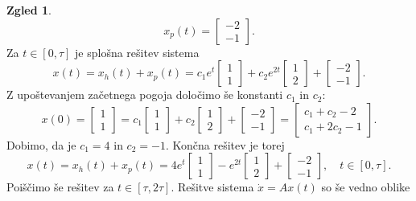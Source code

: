 \documentclass[12pt,a4paper]{amsart}
\theoremstyle{definition} %
\newtheorem{zgled}[definicija]{Zgled}
\theoremstyle{plain} %
\begin{document}
\begin{zgled}
    \[x_p(t)=
    \begin{bmatrix}
        -2  \\
        -1  
    \end{bmatrix}.\]
    Za $t\in[0,\tau]$ je splošna rešitev sistema
    \[x(t)=x_h(t)+x_p(t)= c_1e^t\begin{bmatrix}
        1 \\
        1 
    \end{bmatrix}
    +c_2e^{2t}\begin{bmatrix}
        1 \\
        2 
    \end{bmatrix} + \begin{bmatrix}
        -2  \\
        -1  
    \end{bmatrix}.\]
    Z upoštevanjem začetnega pogoja določimo še konstanti $c_1$ in $c_2$:
    \[x(0)=\begin{bmatrix}
        1  \\
        1  
    \end{bmatrix} = c_1 \begin{bmatrix}
        1  \\
        1  
    \end{bmatrix} + c_2 \begin{bmatrix}
        1  \\
        2  
    \end{bmatrix} + \begin{bmatrix}
        -2  \\
        -1  
    \end{bmatrix} = \begin{bmatrix}
        c_1 + c_2 -2  \\
        c_1+2c_2 -1  
    \end{bmatrix}.\]
    Dobimo, da je $c_1=4$ in $c_2=-1$. Končna rešitev je torej 
    \[x(t)=x_h(t)+x_p(t)= 4e^t\begin{bmatrix}
        1 \\
        1 
    \end{bmatrix}
    -e^{2t}\begin{bmatrix}
        1 \\
        2 
    \end{bmatrix} + \begin{bmatrix}
        -2  \\
        -1  
    \end{bmatrix}, \quad t\in[0,\tau].\]
    Poiščimo še rešitev za $t\in[\tau,2\tau]$. Rešitve sistema $\dot{x}=Ax(t)$ so še vedno oblike

\end{zgled}
\end{document}

